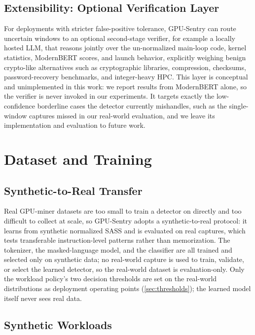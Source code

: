 \subsection{Extensibility: Optional Verification Layer}
\label{sec:verifier}

For deployments with stricter false-positive tolerance, GPU-Sentry can route uncertain windows to an optional second-stage verifier, for example a locally hosted LLM, that reasons jointly over the un-normalized main-loop code, kernel statistics, ModernBERT scores, and launch behavior, explicitly weighing benign crypto-like alternatives such as cryptographic libraries, compression, checksums, password-recovery benchmarks, and integer-heavy HPC. This layer is conceptual and unimplemented in this work: we report results from ModernBERT alone, so the verifier is never invoked in our experiments. It targets exactly the low-confidence borderline cases the detector currently mishandles, such as the single-window captures missed in our real-world evaluation, and we leave its implementation and evaluation to future work.

\section{Dataset and Training}
\label{sec:dataset}

\subsection{Synthetic-to-Real Transfer}

Real GPU-miner datasets are too small to train a detector on directly and too difficult to collect at scale, so GPU-Sentry adopts a synthetic-to-real protocol: it learns from synthetic normalized SASS and is evaluated on real captures, which tests transferable instruction-level patterns rather than memorization. The tokenizer, the masked-language model, and the classifier are all trained and selected only on synthetic data; no real-world capture is used to train, validate, or select the learned detector, so the real-world dataset is evaluation-only. Only the workload policy's two decision thresholds are set on the real-world distributions as deployment operating points (\cref{sec:thresholds}); the learned model itself never sees real data.

\subsection{Synthetic Workloads}

